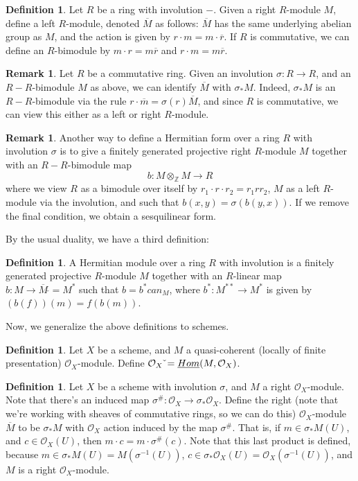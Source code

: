 \documentclass[edeposit,fullpage]{uiucthesis2009}
\newcommand{\Z}{\mathbb Z}
\newcommand{\mc}{\mathcal}
\newcommand{\dual}{\,\check{}}
\theoremstyle{plain}
\numberwithin{lemma}{section}
\theoremstyle{definition}
\newtheorem{definition}[lemma]{Definition}
\newtheorem{remark}[lemma]{Remark}
\begin{document}
\begin{definition}
Let $R$ be a ring with involution $-$. Given a right $R$-module $M$, define
a left $R$-module, denoted $\overline M$ as follows: $\overline M$ has the same underlying abelian
group as $M$, and the action is given by $r \cdot m = m \cdot \overline r$. If $R$ is
commutative, we can define an $R$-bimodule by $m \cdot r =
m \overline r$ and $r \cdot m = m \overline r$. 
\end{definition}

\begin{remark}
Let $R$ be a commutative ring. Given an involution $\sigma : R \rightarrow R$, and an $R-R$-bimodule
$M$ as above, we can identify $\overline M$ with $\sigma_*M$. Indeed,
$\sigma_*M$ is an $R-R$-bimodule via the rule $r \cdot \overline m =
\sigma(r)\overline M$, and since $R$ is commutative, we can view this
either as a left or right $R$-module. 
\end{remark}

\begin{remark}
Another way to define a Hermitian form over a ring $R$ with involution
$\sigma$ is to give a finitely generated projective right $R$-module $M$ together
with an $R-R$-bimodule map  
\[
b :  M \otimes_{\Z}  M \rightarrow R
\]
where we view $R$ as a
bimodule over itself by $r_1 \cdot r \cdot r_2 = r_1rr_2$, $M$ as
a left $R$-module via the involution, and such that $b(x,y) = \sigma(b(y,x))$. If we remove the final
condition, we obtain a sesquilinear form. 
\end{remark}

By the usual duality, we have a third definition:

\begin{definition}
A
Hermitian module over a ring $R$ with involution is a finitely
generated projective $R$-module $M$ together with an $R$-linear map $b : M
\rightarrow \overline{M}\dual = M^*$ such that $b = b^*can_M$, where
$b^* : M^{**} \rightarrow M^*$ is given by $(b(f))(m) = f(b(m))$.
\end{definition}

Now, we generalize the above definitions to schemes.

\begin{definition}
Let $X$ be a scheme, and $M$ a quasi-coherent (locally of finite presentation) $\mc O_X$-module. Define $\mc O_X\dual
= \uline{Hom}(M,\mc O_X)$.
\end{definition}

\begin{definition}
Let $X$ be a scheme with involution $\sigma$, and $M$ a right $\mc
O_X$-module. Note that there's an induced map $\sigma^{\#} : \mc O_X
\rightarrow \sigma_*\mc O_X$. Define the right (note that we're
working with sheaves of commutative rings, so we can do this) $\mc O_X$-module $\overline
M$ to be $\sigma_*M$ with $\mc O_X$ action induced by the map
$\sigma^{\#}$. That is, if $m \in \sigma_*M(U)$, and $c \in \mc
O_X(U)$, then $m \cdot c = m \cdot \sigma^{\#}(c)$. Note that this
last product is defined, because $m \in \sigma_*M(U) =
M(\sigma^{-1}(U))$, $c \in \sigma_*\mc O_X(U) = \mc
O_X(\sigma^{-1}(U))$, and $M$ is a right $\mc O_X$-module. 
\end{definition}
\end{document}
